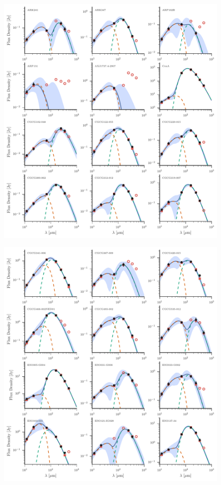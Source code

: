 \begin{figure}
\centering
\includegraphics[width=\textwidth]{figures/sedfig6}
\caption{}
\end{figure}

\begin{figure}
\centering
\includegraphics[width=\textwidth]{figures/sedfig7}
\caption{}
\end{figure}

